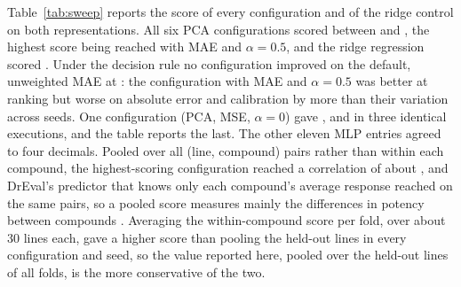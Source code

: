 Table~\ref{tab:sweep} reports the score of every configuration and of the ridge control on both
representations. All six PCA
configurations scored between \SpSweepLo{} and \SpBest{}, the highest score being reached with MAE and
$\alpha = 0.5$, and the ridge regression scored \RidgePca{}. Under the decision rule no configuration
improved on the default, unweighted MAE at \SwPcaMaeZero{}: the configuration with MAE and $\alpha = 0.5$ was better at ranking
but worse on absolute error and calibration by more than their variation across seeds.
One configuration (PCA, MSE, $\alpha = 0$) gave \SwPcaMseZeroAlt{}, \SwPcaMseZeroAltB{} and
\SpSweepLo{} in three identical executions, and the table reports the last. The other eleven MLP entries
agreed to four decimals.
Pooled over all (line, compound) pairs rather than within
each compound, the highest-scoring configuration reached a correlation of about \SpPooled{}, and
DrEval's predictor that knows only each compound's average response reached \SpDrugMeanPooled{} on the
same pairs, so a pooled
score measures mainly the differences in potency between compounds \cite{dreval}. Averaging the
within-compound score per fold, over about 30 lines each, gave a higher score than pooling the held-out
lines in every configuration and seed, so the value reported here, pooled over the held-out lines of
all folds, is the more conservative of the two.

